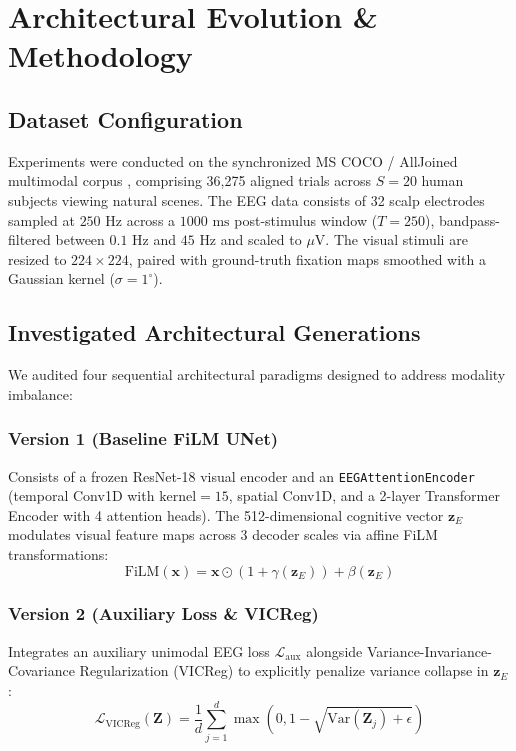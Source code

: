 \documentclass[journal,twocolumn]{IEEEtran}
\begin{document}
\section{Architectural Evolution \& Methodology}

\subsection{Dataset Configuration}
Experiments were conducted on the synchronized MS COCO / AllJoined multimodal corpus \cite{gifford2022alljoined}, comprising 36,275 aligned trials across $S=20$ human subjects viewing natural scenes. The EEG data consists of 32 scalp electrodes sampled at $250\text{ Hz}$ across a $1000\text{ ms}$ post-stimulus window ($T=250$), bandpass-filtered between $0.1\text{ Hz}$ and $45\text{ Hz}$ and scaled to $\mu\text{V}$. The visual stimuli are resized to $224 \times 224$, paired with ground-truth fixation maps smoothed with a Gaussian kernel ($\sigma = 1^\circ$).

\subsection{Investigated Architectural Generations}
We audited four sequential architectural paradigms designed to address modality imbalance:

\subsubsection{Version 1 (Baseline FiLM UNet)}
Consists of a frozen ResNet-18 visual encoder and an \texttt{EEGAttentionEncoder} (temporal Conv1D with $\text{kernel}=15$, spatial Conv1D, and a 2-layer Transformer Encoder with 4 attention heads). The 512-dimensional cognitive vector $\mathbf{z}_E$ modulates visual feature maps across 3 decoder scales via affine FiLM transformations:
\begin{equation}
\text{FiLM}(\mathbf{x}) = \mathbf{x} \odot (1 + \gamma(\mathbf{z}_E)) + \beta(\mathbf{z}_E)
\end{equation}

\subsubsection{Version 2 (Auxiliary Loss \& VICReg)}
Integrates an auxiliary unimodal EEG loss $\mathcal{L}_{\text{aux}}$ alongside Variance-Invariance-Covariance Regularization (VICReg) to explicitly penalize variance collapse in $\mathbf{z}_E$:
\begin{equation}
\mathcal{L}_{\text{VICReg}}(\mathbf{Z}) = \frac{1}{d} \sum_{j=1}^{d} \max\left(0, 1 - \sqrt{\text{Var}(\mathbf{Z}_j) + \epsilon}\right)
\end{equation}
\end{document}
